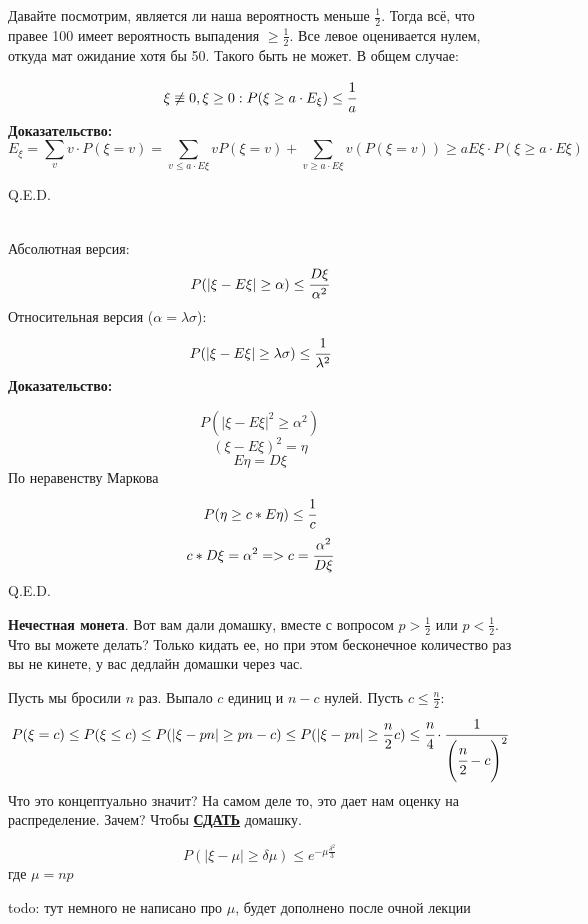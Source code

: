 Давайте посмотрим, является ли наша вероятность меньше $\frac 1 2$. Тогда всё, что правее 100 имеет вероятность выпадения $\geq \frac1 2 $. Все левое оценивается нулем, откуда мат ожидание хотя бы 50. Такого быть не может. В общем случае:

$$\xi\not \equiv0,\xi\geq 0: P(\xi\geq a \cdot E_{\xi}) \leq \cfrac{1}{a}$$
\textbf{Доказательство:}
$$E_{\xi} = \sum\limits_{v}v \cdot P(\xi = v) = \sum\limits_{v \le a \cdot E\xi} v P(\xi = v)+ \sum\limits_{v\geq a\cdot E\xi} v (P(\xi=v))\geq a E{\xi}\cdot P (\xi\geq a\cdot E{\xi})$$

\hfill Q.E.D.

 \\
Абсолютная версия:
$$P(|\xi-E\xi|\geq \alpha)\leq \cfrac{D\xi}{\alpha^2}$$
Относительная версия ($\alpha = \lambda\sigma$):
$$P(|\xi-E\xi|\geq \lambda\sigma)\leq \cfrac{1}{\lambda^2}$$
\textbf{Доказательство:}

$$P(|\xi-E\xi|^2\geq\alpha^2)$$
$$(\xi-E\xi)^2=\eta$$
$$E\eta=D\xi$$
По неравенству Маркова
$$P(\eta\geq c*E\eta)\leq \cfrac{1}{c}$$
$$c * D\xi=\alpha^2 => c=\cfrac{\alpha^2}{D\xi}$$
\hfill Q.E.D.

\textbf{Нечестная монета}. Вот вам дали домашку, вместе  с вопросом $p>\frac{1}{2}$ или $p<\frac{1}{2}$. Что вы можете делать? Только кидать ее, но при этом бесконечное количество раз вы не кинете, у вас дедлайн домашки через час. 

Пусть мы бросили $n$ раз. Выпало $c$ единиц и $n-c$ нулей. Пусть $c\le \frac{n}{2}$:
$$P(\xi = c)\leq P(\xi\leq c)\leq P(|\xi-pn|\geq pn-c)\leq  P(|\xi-pn|\geq \frac n 2 c)\leq \cfrac{n}{4}\cdot \cfrac{1}{\left(\cfrac{n}{2}-c\right)^2}$$
Что это концептуально значит? На самом деле то, это дает нам оценку на распределение. Зачем? Чтобы \textbf{\uline{СДАТЬ}} домашку.

$$P(|\xi-\mu |\geq \delta\mu)\leq e^{-\mu\frac{\delta^2}{3}}$$
где $\mu = np$  

todo: тут немного не написано про $\mu$, будет дополнено после очной лекции

